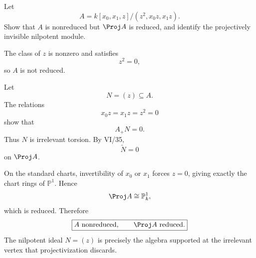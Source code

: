\begin{problem}\label{prob:vi37-19}
Let
\[
A=k[x_0,x_1,z]/(z^2,x_0z,x_1z).
\]
Show that \(A\) is nonreduced but \(\Proj A\) is reduced, and identify the projectively invisible nilpotent module.

\end{problem}

\ifdefined\FullProblemDossiers
\begin{solution}
The class of \(z\) is nonzero and satisfies
\[
z^2=0,
\]
so \(A\) is not reduced.

Let
\[
N=(z)\subseteq A.
\]
The relations
\[
x_0z=x_1z=z^2=0
\]
show that
\[
A_+N=0.
\]
Thus \(N\) is irrelevant torsion. By VI/35,
\[
\widetilde N=0
\]
on \(\Proj A\).

On the standard charts, invertibility of \(x_0\) or \(x_1\) forces \(z=0\), giving exactly the chart rings of \(\mathbb P^1\). Hence
\[
\Proj A\cong\mathbb P^1_k,
\]
which is reduced. Therefore
\[
\boxed{
A\text{ nonreduced},\qquad
\Proj A\text{ reduced}.
}
\]
The nilpotent ideal \(N=(z)\) is precisely the algebra supported at the irrelevant vertex that projectivization discards.
\end{solution}
\fi
